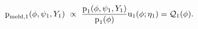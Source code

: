 \begin{equation}
  \text{p}_{\text{meld}, 1}(\phi, \psi_{1}, Y_{1}) \,\,\propto\,\,
  \frac {
    \text{p}_{1}(\phi, \psi_1, Y_{1})
  } {
    \text{p}_{1}(\phi)
  }
  \text{u}_{1}(\phi; \eta_{1})
  =
  \mathcal{Q}_{1}(\phi).
  \label{eqn:stage-one-target}
\end{equation}